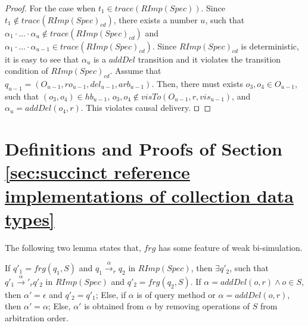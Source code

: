 \begin {proof}
For the case when $t_1 \in \mathit{trace}( \mathit{RImp}(\mathit{Spec}) )$. Since $t_1 \notin \mathit{trace}( \mathit{RImp}(\mathit{Spec})_{\mathit{cd}} )$, there exists a number $u$, such that $\alpha_1 \cdot \ldots \cdot \alpha_u \notin \mathit{trace}( \mathit{RImp}(\mathit{Spec})_{\mathit{cd}} )$ and $\alpha_1 \cdot \ldots \cdot \alpha_{u-1} \in \mathit{trace}( \mathit{RImp}(\mathit{Spec})_{\mathit{cd}} )$. Since $\mathit{RImp}(\mathit{Spec})_{\mathit{cd}}$ is deterministic, it is easy to see that $\alpha_u$ is a $\mathit{addDel}$ transition and it violates the transition condition of $\mathit{RImp}(\mathit{Spec})_{\mathit{cd}}$. Assume that $q_{\mathit{u-1}} = (O_{u-1},\mathit{ro}_{u-1},\mathit{del}_{u-1},\mathit{arb}_{u-1})$. Then, there must exists $o_3,o_4 \in O_{u-1}$, such that $(o_3,o_4) \in \mathit{hb}_{u-1}$, $o_3,o_4 \notin \mathit{visTo}(O_{u-1},r,\mathit{vis}_{u-1})$, and $\alpha_u = \mathit{addDel}(o_4,r)$. This violates causal delivery. $\qed$
\end {proof}













\section{Definitions and Proofs of Section \ref{sec:succinct reference implementations of collection data types}}
\label{sec:appendix definitions and proofs of section succinct reference implementations of collection data types}

The following two lemma states that, $\mathit{frg}$ has some feature of weak bi-simulation.

\begin{lemma}
\label{lemma:RImpSpec is simulated by SRimpSpec}
If $q'_1 = \mathit{frg}(q_1,S)$ and $q_1 {\xrightarrow{\alpha}}_r q_2$ in $\mathit{RImp}(\mathit{Spec})$, then $\exists q'_2$, such that $q'_1 {\xrightarrow{\alpha}'}_r q'_2$ in $\mathit{RImp}(\mathit{Spec})$ and $q'_2 = \mathit{frg}(q_2,S)$. If $\alpha = \mathit{addDel}(o,r) \wedge o \in S$, then $\alpha' = \epsilon$ and $q'_2 = q'_1$; Else, if $\alpha$ is of query method or $\alpha = \mathit{addDel}(o,r)$, then $\alpha' = \alpha$; Else, $\alpha'$ is obtained from $\alpha$ by removing operations of $S$ from arbitration order.
\end{lemma}

